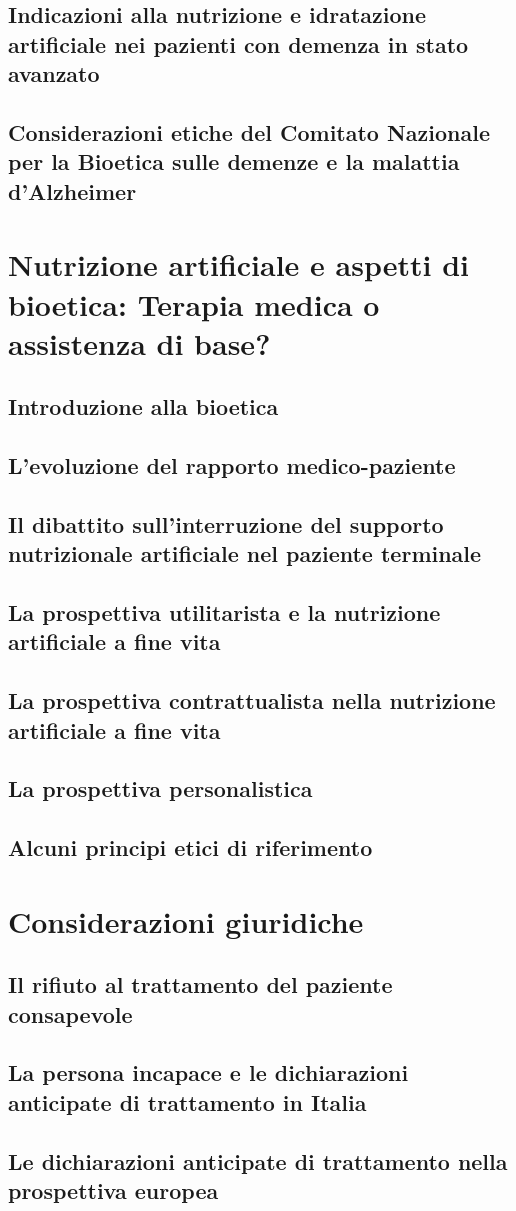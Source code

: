 \documentclass[12pt,a4paper,oneside]{book}
\begin{document}
\section{Indicazioni alla nutrizione e idratazione artificiale nei pazienti con demenza in stato avanzato}
\section{Considerazioni etiche del Comitato Nazionale per la Bioetica sulle demenze e la malattia d'Alzheimer}

\chapter{Nutrizione artificiale e aspetti di bioetica: Terapia medica o assistenza di base?}
\section{Introduzione alla bioetica}
\section{L'evoluzione del rapporto medico-paziente}
\section{Il dibattito sull'interruzione del supporto nutrizionale artificiale nel paziente terminale}
\section{La prospettiva utilitarista e la nutrizione artificiale a fine vita}
\section{La prospettiva contrattualista nella nutrizione artificiale a fine vita}
\section{La prospettiva personalistica }
\section{Alcuni principi etici di riferimento }

\chapter{Considerazioni giuridiche}
\section{ Il rifiuto al trattamento del paziente consapevole }
\section{La persona incapace e le dichiarazioni anticipate di trattamento in Italia}
\section{Le dichiarazioni anticipate di trattamento nella prospettiva europea}

\nocite{*} 
\end{document}
